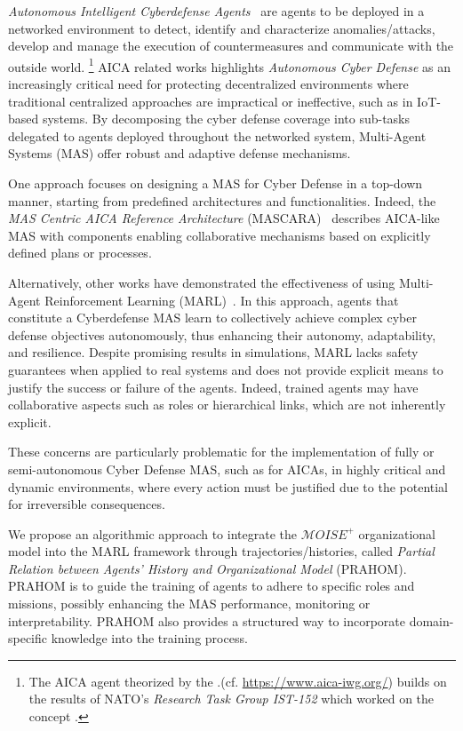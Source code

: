 \documentclass[conference]{IEEEtran}
\begin{document}
\textit{Autonomous Intelligent Cyberdefense Agents}~\cite{Kott2023} are agents to be deployed in a networked environment to detect, identify and characterize anomalies/attacks, develop and manage the execution of countermeasures and communicate with the outside world.
%
\footnote{
    The AICA agent theorized by the .(cf. \url{https://www.aica-iwg.org/}) builds on the results of NATO's \textit{Research Task Group IST-152} which worked on the concept .}
%
AICA related works highlights \textit{Autonomous Cyber Defense} as an increasingly critical need for protecting decentralized environments where traditional centralized approaches are impractical or ineffective, such as in IoT-based systems. By decomposing the cyber defense coverage into sub-tasks delegated to agents deployed throughout the networked system, Multi-Agent Systems (MAS) offer robust and adaptive defense mechanisms.

One approach focuses on designing a MAS for Cyber Defense in a top-down manner, starting from predefined architectures and functionalities. Indeed, the \textit{MAS Centric AICA Reference Architecture} (MASCARA)~\cite{Kott2023} describes AICA-like MAS with components enabling collaborative mechanisms based on explicitly defined plans or processes.

Alternatively, other works have demonstrated the effectiveness of using Multi-Agent Reinforcement Learning (MARL)~\cite{Albrecht2024}. In this approach, agents that constitute a Cyberdefense MAS learn to collectively achieve complex cyber defense objectives autonomously, thus enhancing their autonomy, adaptability, and resilience. Despite promising results in simulations, MARL lacks safety guarantees when applied to real systems and does not provide explicit means to justify the success or failure of the agents. Indeed, trained agents may have collaborative aspects such as roles or hierarchical links, which are not inherently explicit.

These concerns are particularly problematic for the implementation of fully or semi-autonomous Cyber Defense MAS, such as for AICAs, in highly critical and dynamic environments, where every action must be justified due to the potential for irreversible consequences.

We propose an algorithmic approach to integrate the $\mathcal{M}OISE^+$ organizational model into the MARL framework through trajectories/histories, called \textit{Partial Relation between Agents' History and Organizational Model} (PRAHOM). PRAHOM is to guide the training of agents to adhere to specific roles and missions, possibly enhancing the MAS performance, monitoring or interpretability. PRAHOM also provides a structured way to incorporate domain-specific knowledge into the training process.
\end{document}
